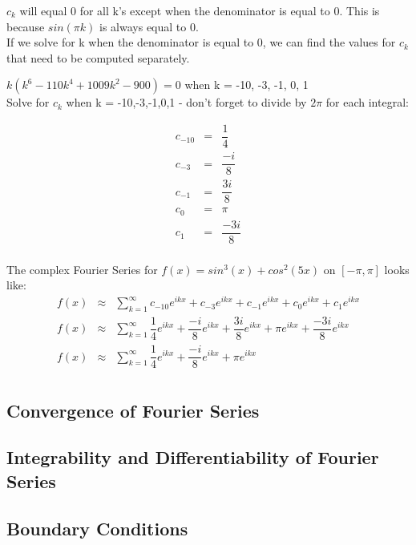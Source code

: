 \documentclass{article}
\newcommand{\bea}{\begin{eqnarray*}}
\newcommand{\eea}{\end{eqnarray*}}
\newcommand{\red}[1]{\textcolor{red}{#1}}
\newcommand{\blue}[1]{\textcolor{blue}{#1}}
\begin{document}
$c_k$ will equal 0 for all k's except when the denominator is equal to 0. This is because $sin(\pi k)$ is always equal to 0.\\

If we solve for k when the denominator is equal to 0, we can find the values for $c_k$ that need to be computed separately. \newline

$k(k^6-110k^4+1009k^2-900)=0$ when k = -10, -3, -1, 0, 1 \\

Solve for $c_k$ when k = -10,-3,-1,0,1 - don't forget to divide by $2\pi$ for each integral:\newline

\bea
c_{-10} &=& \dfrac{1}{4} \\
c_{-3} &=& \dfrac{-i}{8} \\
c_{-1} &=& \dfrac{3i}{8} \\
c_0 &=& \pi \\
c_1 &=& \dfrac{-3i}{8}\\
\eea

The complex Fourier Series for $f(x) = sin^3(x)+cos^2(5x)$ on $[-\pi,\pi]$ looks like:
\bea
f(x) &\approx& \sum_{k=1}^{\infty} c_{-10}e^{ikx} + c_{-3}e^{ikx} + c_{-1}e^{ikx} + c_{0}e^{ikx} + c_{1}e^{ikx} \\
f(x) &\approx& \sum_{k=1}^{\infty} \dfrac{1}{4}e^{ikx} + \dfrac{-i}{8}e^{ikx} + \dfrac{3i}{8}e^{ikx} + \pi e^{ikx} + \dfrac{-3i}{8}e^{ikx} \\
f(x) &\approx&  \sum_{k=1}^{\infty} \dfrac{1}{4}e^{ikx} + \dfrac{-i}{8}e^{ikx} + \pi e^{ikx}\\
\eea



\subsection{Convergence of Fourier Series}

\subsection{Integrability and Differentiability of Fourier Series}

\subsection{Boundary Conditions}
\end{document}
